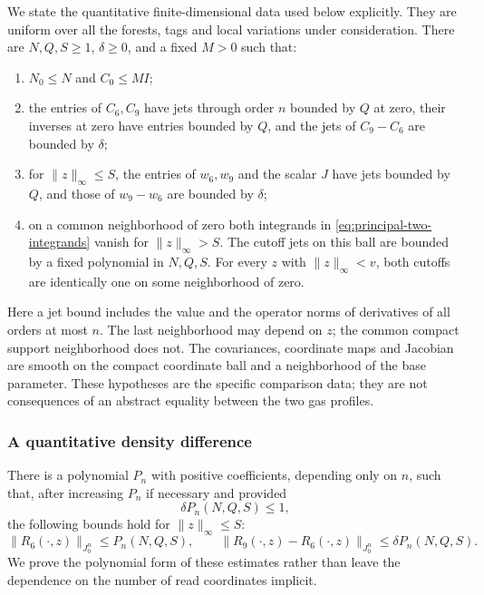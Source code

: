 We state the quantitative finite-dimensional data used below
explicitly. They are uniform over all the forests, tags and local
variations under consideration. There are $N,Q,S\ge1$,
$\delta\ge0$, and a fixed $M>0$ such that:
\begin{enumerate}
\item $N_0\le N$ and $C_0\le MI$;
\item the entries of $C_6,C_9$ have jets through order $n$
bounded by $Q$ at zero, their inverses at zero have entries
bounded by $Q$, and the jets of $C_9-C_6$ are bounded by $\delta$;
\item for $\|z\|_\infty\le S$, the entries of $w_6,w_9$ and
the scalar $J$ have jets bounded by $Q$, and those of
$w_9-w_6$ are bounded by $\delta$;
\item on a common neighborhood of zero both integrands in
\eqref{eq:principal-two-integrands} vanish for $\|z\|_\infty>S$.
The cutoff jets on this ball are bounded by a fixed polynomial
in $N,Q,S$. For every $z$ with $\|z\|_\infty<v$, both cutoffs
are identically one on some neighborhood of zero.
\end{enumerate}
Here a jet bound includes the value and the operator norms of
derivatives of all orders at most $n$. The last neighborhood may
depend on $z$; the common compact support neighborhood does not.
The covariances, coordinate maps and Jacobian are smooth on the
compact coordinate ball and a neighborhood of the base parameter.
These hypotheses are the specific comparison data; they are not
consequences of an abstract equality between the two gas profiles.

\subsubsection{A quantitative density difference}
There is a polynomial $P_n$ with positive coefficients, depending
only on $n$, such that, after increasing $P_n$ if necessary and
provided
\begin{equation}\label{eq:principal-delta-small}
                      \delta P_n(N,Q,S)\le1,
\end{equation}
the following bounds hold for $\|z\|_\infty\le S$:
\begin{equation}\label{eq:principal-density-jets}
 \|R_6(\cdot,z)\|_{J^n_0}\le P_n(N,Q,S),\qquad
 \|R_9(\cdot,z)-R_6(\cdot,z)\|_{J^n_0}
                                      \le\delta P_n(N,Q,S).
\end{equation}
We prove the polynomial form of these estimates rather than leave
the dependence on the number of read coordinates implicit.

